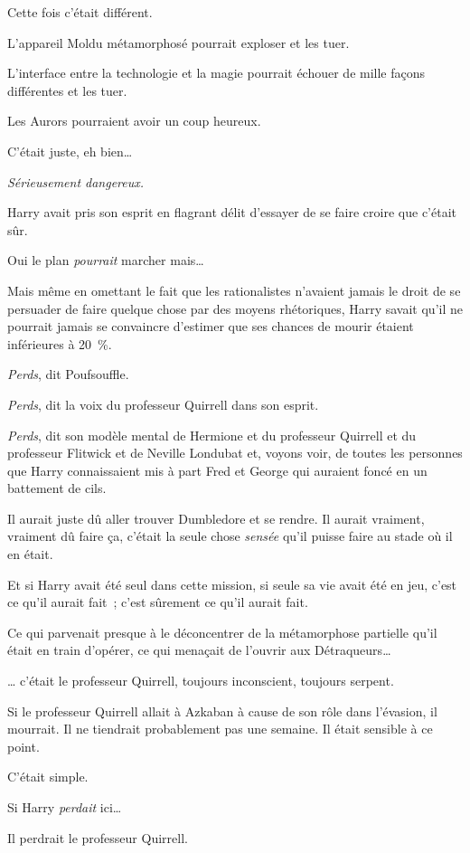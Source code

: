 Cette fois c'était différent.

L'appareil Moldu métamorphosé pourrait exploser et les tuer.

L'interface entre la technologie et la magie pourrait échouer de mille façons différentes et les tuer.

Les Aurors pourraient avoir un coup heureux.

C'était juste, eh bien…

\emph{Sérieusement dangereux.}

Harry avait pris son esprit en flagrant délit d'essayer de se faire croire que c'était sûr.

Oui le plan \emph{pourrait} marcher mais…

Mais même en omettant le fait que les rationalistes n'avaient jamais le droit de se persuader de faire quelque chose par des moyens rhétoriques, Harry savait qu'il ne pourrait jamais se convaincre d'estimer que ses chances de mourir étaient inférieures à 20~\%.

\emph{Perds}, dit Poufsouffle.

\emph{Perds}, dit la voix du professeur Quirrell dans son esprit.

\emph{Perds}, dit son modèle mental de Hermione et du professeur Quirrell et du professeur Flitwick et de Neville Londubat et, voyons voir, de toutes les personnes que Harry connaissaient mis à part Fred et George qui auraient foncé en un battement de cils.

Il aurait juste dû aller trouver Dumbledore et se rendre. Il aurait vraiment, vraiment dû faire ça, c'était la seule chose \emph{sensée} qu'il puisse faire au stade où il en était.

Et si Harry avait été seul dans cette mission, si seule sa vie avait été en jeu, c'est ce qu'il aurait fait~; c'est sûrement ce qu'il aurait fait.

Ce qui parvenait presque à le déconcentrer de la métamorphose partielle qu'il était en train d'opérer, ce qui menaçait de l'ouvrir aux Détraqueurs…

… c'était le professeur Quirrell, toujours inconscient, toujours serpent.

Si le professeur Quirrell allait à Azkaban à cause de son rôle dans l'évasion, il mourrait. Il ne tiendrait probablement pas une semaine. Il était sensible à ce point.

C'était simple.

Si Harry \emph{perdait} ici…

Il perdrait le professeur Quirrell.


